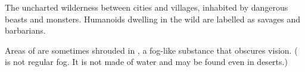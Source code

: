 \begin{gloss}
\begin{comment}
\paragraph{\Wylde}
\end{comment}
\gitemthe{\Wylde}
The uncharted wilderness between cities and villages, inhabited by dangerous beasts and monsters. 
Humanoids dwelling in the wild are labelled as savages and barbarians. 

\index{\wildfog}
Areas of \Wylde{} are sometimes shrouded in \wildfog, a fog-like substance that obscures vision. 
(\Wildfog{} is not regular fog. 
It is not made of water and may be found even in deserts.) 



\end{gloss}




